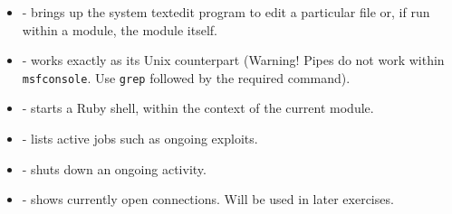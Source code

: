 \begin{itemize}
    \item {} - brings up the system textedit program to edit a particular file or, if run within a module, the module itself.
    \item {} - works exactly as its Unix counterpart (Warning! Pipes do not work within \texttt{msfconsole}. Use \texttt{grep} followed by the required command).
    \item {} - starts a Ruby shell, within the context of the current module.
    \item {} - lists active jobs such as ongoing exploits.
    \item {} - shuts down an ongoing activity.
    \item {} - shows currently open connections. Will be used in later exercises.
\end{itemize}

\clearpage
